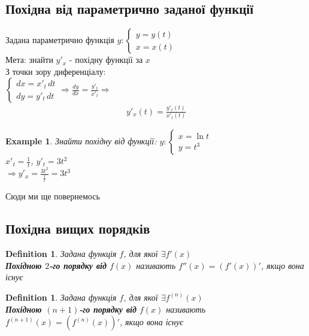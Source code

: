 \documentclass[a4paper, 14pt]{extarticle}
\def\huge{\displaystyle}
\def\bigline{\vspace{5mm}\\}
\theoremstyle{theoremdd}
\theoremstyle{theoremdd}
\newtheorem{definition}[theorem]{Definition}
\theoremstyle{theoremdd}
\theoremstyle{theoremdd}
\newtheorem{example}[theorem]{Example}
\theoremstyle{theoremdd}
\theoremstyle{theoremdd}
\theoremstyle{theoremdd}
\theoremstyle{theoremdd}
\begin{document}
\subsection{Похідна від параметрично заданої функції}
Задана параметрично функція $y: \begin{cases} y = y(t) \\ x = x(t) \end{cases}$\\
Мета: знайти $y'_x$ - похідну функції за $x$\\
З точки зору диференціалу:\\
$\begin{cases} dx = x'_t\,dt \\ dy = y'_t\,dt \end{cases} \Rightarrow \huge \frac{dy}{dx} = \frac{y'_t}{x'_t} \Rightarrow$
\begin{align*}
y'_x(t) = \frac{y'_t(t)}{x'_t(t)}
\end{align*}
\begin{example} 
Знайти похідну від функції: $y: \begin{cases} x = \ln t \\ y = t^3 \end{cases}$\\
$x'_t = \huge \frac{1}{t}$,    $y'_t = 3t^2$\\
$\Rightarrow y'_x = \huge \frac{3t^2}{\frac{1}{t}} = 3t^3$
\end{example}
Сюди ми ще повернемось \bigline

\subsection{Похідна вищих порядків}
\begin{definition}
Задана функція $f$, для якої $\exists f'(x)$\\
\textbf{Похідною $2$-го порядку від} $f(x)$ називають $f''(x) = (f'(x))'$, якщо вона існує
\end{definition}

\begin{definition}
Задана функція $f$, для якої $\exists f^{(n)}(x)$\\
\textbf{Похідною $(n+1)$-го порядку від} $f(x)$ називають $f^{(n+1)}(x) = (f^{(n)}(x))'$, якщо вона існує
\end{definition}
\end{document}

